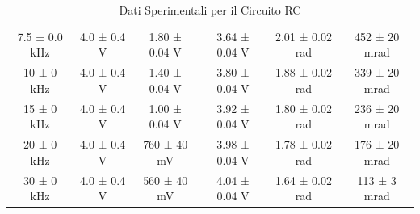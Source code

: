 \documentclass[a4paper]{article}
\begin{document}
\begin{table}[htbp]
\begin{tabular}{|c|c|c|c|c|c|}
    7.5 ± 0.0 kHz & 4.0 ± 0.4 V & 1.80 ± 0.04 V & 3.64 ± 0.04 V & 2.01 ± 0.02 rad & 452 ± 20 mrad \\
    10 ± 0 kHz & 4.0 ± 0.4 V & 1.40 ± 0.04 V & 3.80 ± 0.04 V & 1.88 ± 0.02 rad & 339 ± 20 mrad \\
    15 ± 0 kHz & 4.0 ± 0.4 V & 1.00 ± 0.04 V & 3.92 ± 0.04 V & 1.80 ± 0.02 rad & 236 ± 20 mrad \\
    20 ± 0 kHz & 4.0 ± 0.4 V & 760 ± 40 mV & 3.98 ± 0.04 V & 1.78 ± 0.02 rad & 176 ± 20 mrad \\
    30 ± 0 kHz & 4.0 ± 0.4 V & 560 ± 40 mV & 4.04 ± 0.04 V & 1.64 ± 0.02 rad & 113 ± 3 mrad \\
    \hline
    \end{tabular}
    \caption{Dati Sperimentali per il Circuito RC}
    \end{table}
\end{document}

